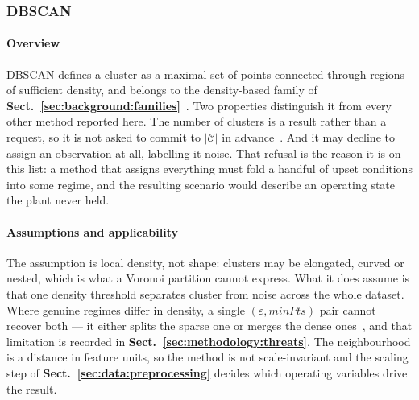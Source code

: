 \subsubsection{DBSCAN}
\label{sec:tech:dbscan}

\paragraph{Overview}
\label{sec:tech:dbscan:overview}
DBSCAN defines a cluster as a maximal set of points connected through
regions of sufficient density, and belongs to the density-based family of
\textbf{Sect.~\ref{sec:background:families}}~\cite{ref_36}. Two properties
distinguish it from every other method reported here. The number of
clusters is a result rather than a request, so it is not asked to commit
to $|\mathcal C|$ in advance~\cite{ref_1}. And it may decline to assign an
observation at all, labelling it noise. That refusal is the reason it is
on this list: a method that assigns everything must fold a handful of
upset conditions into some regime, and the resulting scenario would
describe an operating state the plant never held.

\paragraph{Assumptions and applicability}
\label{sec:tech:dbscan:assumptions}
The assumption is local density, not shape: clusters may be elongated,
curved or nested, which is what a Voronoi partition cannot express. What
it does assume is that one density threshold separates cluster from noise
across the whole dataset. Where genuine regimes differ in density, a
single $(\varepsilon, \mathit{minPts})$ pair cannot recover both --- it
either splits the sparse one or merges the dense ones~\cite{ref_37}, and
that limitation is recorded in
\textbf{Sect.~\ref{sec:methodology:threats}}. The neighbourhood is a
distance in feature units, so the method is not scale-invariant and the
scaling step of \textbf{Sect.~\ref{sec:data:preprocessing}} decides which
operating variables drive the result.

